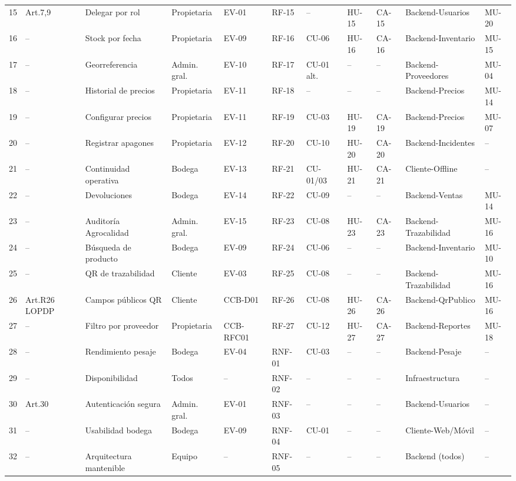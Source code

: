 \documentclass[11pt,a4paper]{article}
\begin{document}
\begin{longtable}{|p{0.3cm}|p{1.2cm}|p{2.2cm}|p{1.5cm}|p{0.7cm}|p{0.8cm}|p{0.7cm}|p{0.8cm}|p{0.8cm}|p{2.3cm}|p{1cm}|}
15 & Art.7,9 & Delegar por rol & Propietaria & EV-01 & RF-15 & -- & HU-15 & CA-15 & Backend-Usuarios & MU-20 \\
16 & -- & Stock por fecha & Propietaria & EV-09 & RF-16 & CU-06 & HU-16 & CA-16 & Backend-Inventario & MU-15 \\
17 & -- & Georreferencia & Admin. gral. & EV-10 & RF-17 & CU-01 alt. & -- & -- & Backend-Proveedores & MU-04 \\
18 & -- & Historial de precios & Propietaria & EV-11 & RF-18 & -- & -- & -- & Backend-Precios & MU-14 \\
19 & -- & Configurar precios & Propietaria & EV-11 & RF-19 & CU-03 & HU-19 & CA-19 & Backend-Precios & MU-07 \\
20 & -- & Registrar apagones & Propietaria & EV-12 & RF-20 & CU-10 & HU-20 & CA-20 & Backend-Incidentes & -- \\
21 & -- & Continuidad operativa & Bodega & EV-13 & RF-21 & CU-01/03 & HU-21 & CA-21 & Cliente-Offline & -- \\
22 & -- & Devoluciones & Bodega & EV-14 & RF-22 & CU-09 & -- & -- & Backend-Ventas & MU-14 \\
23 & -- & Auditoría Agrocalidad & Admin. gral. & EV-15 & RF-23 & CU-08 & HU-23 & CA-23 & Backend-Trazabilidad & MU-16 \\
24 & -- & Búsqueda de producto & Bodega & EV-09 & RF-24 & CU-06 & -- & -- & Backend-Inventario & MU-10 \\
25 & -- & QR de trazabilidad & Cliente & EV-03 & RF-25 & CU-08 & -- & -- & Backend-Trazabilidad & MU-16 \\
26 & Art.R26 LOPDP & Campos públicos QR & Cliente & CCB-D01 & RF-26 & CU-08 & HU-26 & CA-26 & Backend-QrPublico & MU-16 \\
27 & -- & Filtro por proveedor & Propietaria & CCB-RFC01 & RF-27 & CU-12 & HU-27 & CA-27 & Backend-Reportes & MU-18 \\
28 & -- & Rendimiento pesaje & Bodega & EV-04 & RNF-01 & CU-03 & -- & -- & Backend-Pesaje & -- \\
29 & -- & Disponibilidad & Todos & -- & RNF-02 & -- & -- & -- & Infraestructura & -- \\
30 & Art.30 & Autenticación segura & Admin. gral. & EV-01 & RNF-03 & -- & -- & -- & Backend-Usuarios & -- \\
31 & -- & Usabilidad bodega & Bodega & EV-09 & RNF-04 & CU-01 & -- & -- & Cliente-Web/Móvil & -- \\
32 & -- & Arquitectura mantenible & Equipo & -- & RNF-05 & -- & -- & -- & Backend (todos) & -- \\

\end{longtable}
\end{document}
